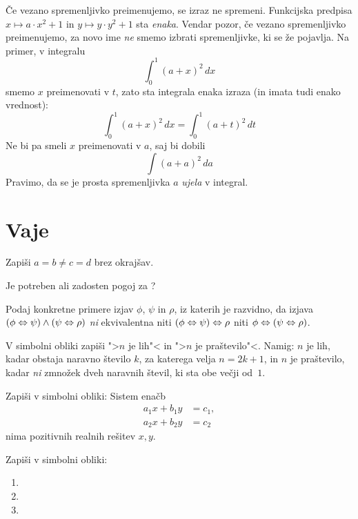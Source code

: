 Če vezano spremenljivko preimenujemo, se izraz ne spremeni. Funkcijska predpisa $x \mapsto a \cdot x^2 + 1$ in $y \mapsto y \cdot y^2 + 1$ sta \emph{enaka}. Vendar pozor, če vezano spremenljivko preimenujemo, za novo ime \emph{ne} smemo izbrati spremenljivke, ki se že pojavlja. Na primer, v integralu
%
\begin{equation*}
  \int_0^1 (a + x)^2 \, d x
\end{equation*}
%
smemo $x$ preimenovati v $t$, zato sta integrala enaka izraza (in imata tudi enako vrednost):
%
\begin{equation*}
  \int_0^1 (a + x)^2 \, d x  = \int_0^1 (a + t)^2 \, d t
\end{equation*}
%
Ne bi pa smeli $x$ preimenovati v $a$, saj bi dobili
%
\begin{equation*}
  \int (a + a)^2 \, d a
\end{equation*}
%
Pravimo, da se je prosta spremenljivka $a$ \emph{ujela} v integral.

\section{Vaje}

\begin{vaja}
  Zapiši $a = b \neq c = d$ brez okrajšav.
\end{vaja}

\begin{vaja}
  Je  potreben ali zadosten
  pogoj za ?
\end{vaja}

\begin{vaja}
  Podaj konkretne primere izjav $\phi$, $\psi$ in $\rho$, iz katerih
  je razvidno, da izjava $(\phi \Leftrightarrow \psi) \land (\psi \Leftrightarrow \rho)$
  \emph{ni} ekvivalentna niti $(\phi \Leftrightarrow \psi) \Leftrightarrow \rho$ niti
  $\phi \Leftrightarrow (\psi \Leftrightarrow \rho)$.
\end{vaja}

\begin{vaja}
  V simbolni obliki zapiši ">$n$ je lih"< in ">$n$ je praštevilo"<.
  Namig: $n$ je lih, kadar obstaja naravno število $k$, za katerega
  velja $n = 2 k + 1$, in $n$ je praštevilo, kadar \emph{ni} zmnožek
  dveh naravnih števil, ki sta obe večji od~$1$.
\end{vaja}

\begin{vaja}
  Zapiši v simbolni obliki: Sistem enačb
  \begin{align*}
    a_1 x + b_1 y &= c_1,\\
    a_2 x + b_2 y &= c_2
  \end{align*}
  nima pozitivnih realnih rešitev $x, y$.
\end{vaja}

\begin{vaja}
  Zapiši v simbolni obliki:
  \begin{enumerate}
  \item {}
  \item {}
  \item {}
  \end{enumerate}
\end{vaja}

